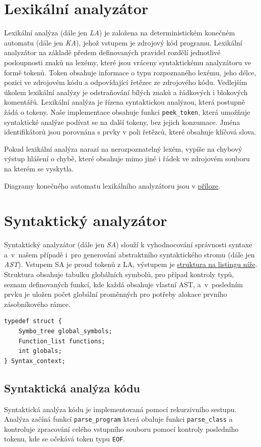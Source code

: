 \documentclass[a4paper,11pt]{article}
\begin{document}
\section{Lexikální analyzátor}
Lexikální analýza (dále jen \emph{LA}) je založena na deterministickém konečném automatu (dále jen \textit{KA}), jehož vstupem je zdrojový kód programu. Lexikální analyzátor na základě předem definovaných pravidel rozdělí jednotlivé posloupnosti znaků na lexémy, které jsou vráceny syntaktickému analyzátoru ve formě tokenů. Token obsahuje informace o typu rozpoznaného lexému, jeho délce, pozici ve zdrojovém kódu a odpovídající řetězec ze zdrojového kódu. Vedlejším úkolem lexikální analýzy je odstraňování bílých znaků a řádkových i blokových komentářů. Lexikální analýza je řízena syntaktickou analýzou, která postupně žádá o tokeny. Naše implementace obsahuje funkci \texttt{peek\_token}, která umožňuje syntaktické analýze podívat se na další tokeny, bez jejich konzumace. Jména identifikátorů jsou porovnána s prvky v poli řetězců, které obsahuje klíčová slova.

Pokud lexikální analýza narazí na nerozpoznatelný lexém, vypíše na chybový výstup hlášení o chybě, které obsahuje mimo jiné i řádek ve zdrojovém souboru na kterém se vyskytla.

Diagramy konečného automatu lexikálního analyzátoru jsou v \hyperref[diag:LA-FSM]{příloze}.


\section{Syntaktický analyzátor}
Syntaktický analyzátor (dále jen \textit{SA}) slouží k vyhodnocování správnosti syntaxe a~v~našem případě i~pro generování abstraktního syntaktického stromu (dále jen \textit{AST}). Vstupem SA je proud tokenů z LA, výstupem je \hyperref[lst:saOut]{struktura na listingu níže}. Struktura obsahuje tabulku globálních symbolů, pro případ kontroly typů, seznam definovaných funkcí, kde každá obsahuje vlastní AST, a~v~posledním prvku je uložen počet globální proměnných pro potřeby alokace prvního zásobníkového rámce.

\begin{lstlisting}[caption={Výstupní struktura SA}, label={lst:saOut}]
typedef struct {
    Symbo_tree global_symbols;
    Function_list functions;
    int globals;
} Syntax_context;
\end{lstlisting}

\subsection{Syntaktická analýza kódu}
Syntaktická analýza kódu je implementovaná pomocí rekurzivního sestupu. Analýza začíná funkcí \texttt{parse\_program} která obaluje funkci \texttt{parse\_class} a kontroluje zpracování celého vstupního souboru pomocí kontroly posledního tokenu, kde se očekává token typu \texttt{EOF}.
\end{document}
